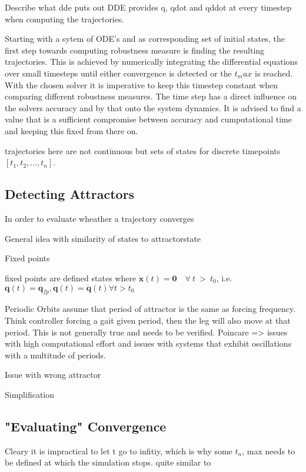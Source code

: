 Describe what dde puts out
    DDE provides q, qdot and qddot at every timestep when computing the trajectories. 


Starting with a sytem of ODE's and as corresponding set of initial states, the first step towards computing robustness measure is finding the resulting trajectories. This is achieved by numerically integrating the differential equations over small timesteps until either convergence is detected or the $t_max$ is reached. With the chosen solver it is imperative to keep this timestep constant when comparing different robustness measures. The time step has a direct influence on the solvers accuracy and by that onto the system dynamics. It is advised to find a value that is a sufficient compromise between accuracy and cumputational time and keeping this fixed from there on.

trajectories here are not continuous but sets of states for discrete timepoints $[t_1,t_2,\ldots, t_n]$. 


\subsection{Detecting Attractors}

In order to evaluate wheather a trajectory converges 
    
    General idea with similarity of states to attractorstate

    Fixed points

    fixed points are defined states where $\dot{\mathbf{x}}(t) = \mathbf{0} \quad \forall \ t\  >\  t_0 $, i.e. $\mathbf{q}(t)=\mathbf{q}_{fp}, \dot{\mathbf{q}}(t) = \ddot{\mathbf{q}}(t)  \forall t > t_0$

    Periodic Orbits
        assume that period of attractor is the same as forcing frequency. Think controller forcing a gait given period, then the leg will also move at that period. This is not generally true and needs to be verified. 
        Poincare => issues with high computational effort and issues with systems that exhibit oscillations with a multitude of periods. 

    Issue with wrong attractor

    Simplification


\subsection{"Evaluating" Convergence}
    Cleary it is impractical to let t go to infitiy, which is why some $t_n$, max needs to be defined at which the simulation stops. 
    quite similar to 

